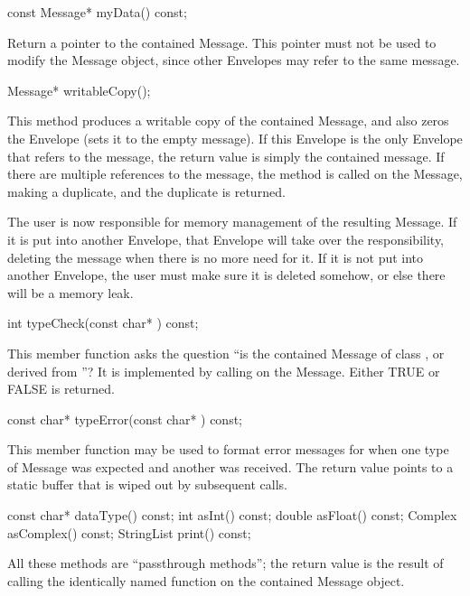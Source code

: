 \begin{example}
const Message* myData() const;
\end{example}

Return a pointer to the contained Message.  This pointer must not be
used to modify the Message object, since other Envelopes may refer to
the same message.

\begin{example}
Message* writableCopy();
\end{example}

This method produces a writable copy of the contained Message, and
also zeros the Envelope (sets it to the empty message).  If this
Envelope is the only Envelope that refers to the message, the
return value is simply the contained message.  If there are multiple
references to the message, the  method is called on the
Message, making a duplicate, and the duplicate is returned.

The user is now responsible for memory management of the resulting
Message.  If it is put into another Envelope, that Envelope will
take over the responsibility, deleting the message when there is
no more need for it.  If it is not put into another Envelope, the
user must make sure it is deleted somehow, or else there will be
a memory leak.

\begin{example}
int typeCheck(const char* ) const;
\end{example}

This member function asks the question ``is the contained Message
of class , or derived from ''?  It is implemented by
calling  on the Message.  Either TRUE or FALSE is returned.

\begin{example}
const char* typeError(const char* ) const;
\end{example}

This member function may be used to format error messages for when
one type of Message was expected and another was received.  The
return value points to a static buffer that is wiped out by subsequent
calls.

\begin{example}
const char* dataType() const;
int asInt() const;
double asFloat() const;
Complex asComplex() const;
StringList print() const;
\end{example}

All these methods are ``passthrough methods''; the return value is the
result of calling the identically named function on the contained
Message object.

